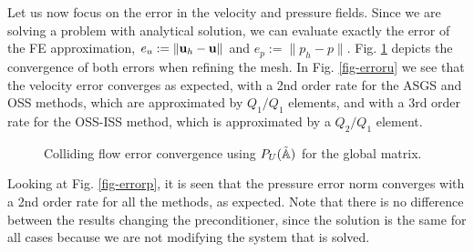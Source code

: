 Let us now focus on the error in the velocity and pressure fields. Since we are solving a problem with analytical solution, we can evaluate exactly the error of the FE approximation, $e_u:=\|{\bf u}_h-{\bf u}\|$  and $e_p:=\|p_h-p\|$. Fig. \ref{fig-error} depicts the convergence of both errors when refining the mesh. In Fig. \ref{fig-erroru} we see that the velocity error converges as expected, with a 2nd order rate for the ASGS and OSS methods, which are approximated by $Q_1/Q_1$ elements, and with a 3rd order rate for the OSS-ISS method, which is approximated by a $Q_2/Q_1$ element. 
\begin{figure}[h!]
  \centering
  \caption{Colliding flow error convergence using $P_U(\tilde{\mathbb{A}})$ for the global matrix.}
  \label{fig-error}
\end{figure}
Looking at Fig. \ref{fig-errorp}, it is seen that the pressure error norm converges with a 2nd order rate for all the methods, as expected.
Note that there is no difference between the results changing the preconditioner, since the solution is the same for all cases because we are not modifying the system that is solved.


